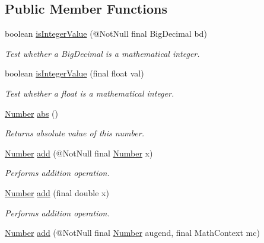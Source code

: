\subsection*{Public Member Functions}
\begin{DoxyCompactItemize}
\item 
boolean \hyperlink{interfacecom_1_1aarrelaakso_1_1drawl_1_1_number_a5bba650d5d9651e83c4ff4364d6f6abc}{is\+Integer\+Value} (@Not\+Null final Big\+Decimal bd)
\begin{DoxyCompactList}\small\item\em Test whether a Big\+Decimal is a mathematical integer. \end{DoxyCompactList}\item 
boolean \hyperlink{interfacecom_1_1aarrelaakso_1_1drawl_1_1_number_a731dbb91dcfd46319662f57c26fcf06a}{is\+Integer\+Value} (final float val)
\begin{DoxyCompactList}\small\item\em Test whether a float is a mathematical integer. \end{DoxyCompactList}\item 
\hyperlink{interfacecom_1_1aarrelaakso_1_1drawl_1_1_number}{Number} \hyperlink{interfacecom_1_1aarrelaakso_1_1drawl_1_1_number_a62af4c1c24c3f9c70dabfe3318e53ac3}{abs} ()
\begin{DoxyCompactList}\small\item\em Returns absolute value of this number. \end{DoxyCompactList}\item 
\hyperlink{interfacecom_1_1aarrelaakso_1_1drawl_1_1_number}{Number} \hyperlink{interfacecom_1_1aarrelaakso_1_1drawl_1_1_number_a05193401712bbba333a586751633c5f6}{add} (@Not\+Null final \hyperlink{interfacecom_1_1aarrelaakso_1_1drawl_1_1_number}{Number} x)
\begin{DoxyCompactList}\small\item\em Performs addition operation. \end{DoxyCompactList}\item 
\hyperlink{interfacecom_1_1aarrelaakso_1_1drawl_1_1_number}{Number} \hyperlink{interfacecom_1_1aarrelaakso_1_1drawl_1_1_number_abd063ef436254888b283a30da6fff78a}{add} (final double x)
\begin{DoxyCompactList}\small\item\em Performs addition operation. \end{DoxyCompactList}\item 
\hyperlink{interfacecom_1_1aarrelaakso_1_1drawl_1_1_number}{Number} \hyperlink{interfacecom_1_1aarrelaakso_1_1drawl_1_1_number_ad71ea7d41bcc751bc6e08ccd0d5f9885}{add} (@Not\+Null final \hyperlink{interfacecom_1_1aarrelaakso_1_1drawl_1_1_number}{Number} augend, final Math\+Context mc)

\end{DoxyCompactItemize}
